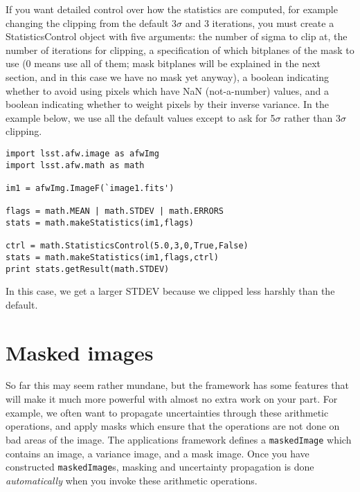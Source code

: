 If you want detailed control over how the statistics are computed, for
example changing the clipping from the default 3$\sigma$ and 3
iterations, you must create a StatisticsControl object with five
arguments: the number of sigma to clip at, the number of iterations
for clipping, a specification of which bitplanes of the mask to use (0
means use all of them; mask bitplanes will be explained in the next
section, and in this case we have no mask yet anyway), a boolean
indicating whether to avoid using pixels which have NaN (not-a-number)
values, and a boolean indicating whether to weight pixels by their
inverse variance.  In the example below, we use all the default values
except to ask for 5$\sigma$ rather than 3$\sigma$ clipping.

\begin{verbatim}
import lsst.afw.image as afwImg
import lsst.afw.math as math

im1 = afwImg.ImageF(`image1.fits')

flags = math.MEAN | math.STDEV | math.ERRORS
stats = math.makeStatistics(im1,flags)

ctrl = math.StatisticsControl(5.0,3,0,True,False)
stats = math.makeStatistics(im1,flags,ctrl)
print stats.getResult(math.STDEV)
\end{verbatim}

In this case, we get a larger STDEV because we clipped less harshly
than the default.


\section{Masked images}

So far this may seem rather mundane, but the framework has some
features that will make it much more powerful with almost no extra
work on your part.  For example, we often want to propagate
uncertainties through these arithmetic operations, and apply masks
which ensure that the operations are not done on bad areas of the
image.  The applications framework defines a \texttt{maskedImage}
which contains an image, a variance image, and a mask image.
Once you have constructed \texttt{maskedImage}s, masking and
uncertainty propagation is done {\it automatically} when you invoke
these arithmetic operations.

